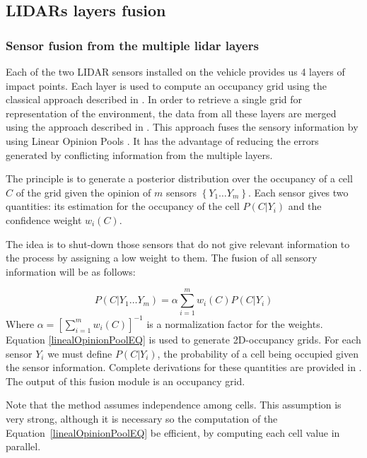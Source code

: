 \subsection{LIDARs layers fusion}

\subsubsection{Sensor fusion from the multiple lidar layers}
Each of the  two LIDAR sensors installed on the vehicle provides us 4 layers of impact points. Each layer is used to compute an occupancy grid using the classical approach described in \cite{Thrun05}. In order to retrieve a single grid for representation of the environment, the data from all these layers are merged using the approach described in \cite{ADARVE-2012-671211}. This approach fuses the sensory information by using Linear Opinion Pools \cite{DeGroot1974}. It has the advantage of reducing the errors generated by conflicting information from the multiple layers.

The principle is to generate a posterior distribution over the occupancy of a cell $C$ of the grid given the opinion of $m$ sensors $\left\{ Y_1 \dots Y_m \right\}$.
Each sensor gives two quantities: its estimation for the occupancy of the cell $P(C | Y_i)$ and the confidence weight $w_i(C)$.

The idea is to shut-down those sensors that do not give relevant information to the process by assigning a low weight to them. The fusion of all sensory information will be as follows:

\begin{equation}
\label{linealOpinionPoolEQ}
  P(C | Y_1 \dots Y_m) = \alpha \sum \limits^m_{i=1} w_i(C) P(C | Y_i)
\end{equation}
Where $\alpha = \left[ \sum \limits^m_{i=1} w_i(C) \right]^{-1}$ is a normalization factor for the weights.  Equation \eqref{linealOpinionPoolEQ} is used to generate
2D-occupancy grids. For each sensor $Y_i$ we must define $P(C | Y_i)$, the probability of a cell being occupied given the sensor information. Complete derivations for these quantities are provided in \cite{ADARVE-2012-671211}. The output of this fusion module is an occupancy grid. %

Note that the method assumes independence among cells. This assumption is very strong, although it is necessary so the computation of the Equation~\eqref{linealOpinionPoolEQ} be efficient, by computing each cell value in parallel. %

